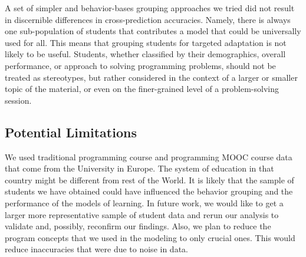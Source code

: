 \documentclass{sigchi}
\begin{document}
A set of simpler and behavior-bases grouping approaches we tried did not result in discernible differences in cross-prediction accuracies. Namely, there is always one sub-population of students that contributes a model that could be universally used for all. This means that grouping students for targeted adaptation is not likely to be useful. Students, whether classified by their demographics, overall performance, or approach to solving programming problems, should not be treated as stereotypes, but rather considered in the context of a larger or smaller topic of the material, or even on the finer-grained level of a problem-solving session.


\subsection{Potential Limitations}

We used traditional programming course and programming MOOC course data that come from the University in Europe. The system of education in that country might be different from rest of the World. It is likely that the sample of students we have obtained could have influenced the behavior grouping and the performance of the models of learning. In future work, we would like to get a larger more representative sample of student data and rerun our analysis to validate and, possibly, reconfirm our findings. Also, we plan to reduce the program concepts that we used in the modeling to only crucial ones. This would reduce inaccuracies  that were due to noise in data.



%
%


\end{document}
